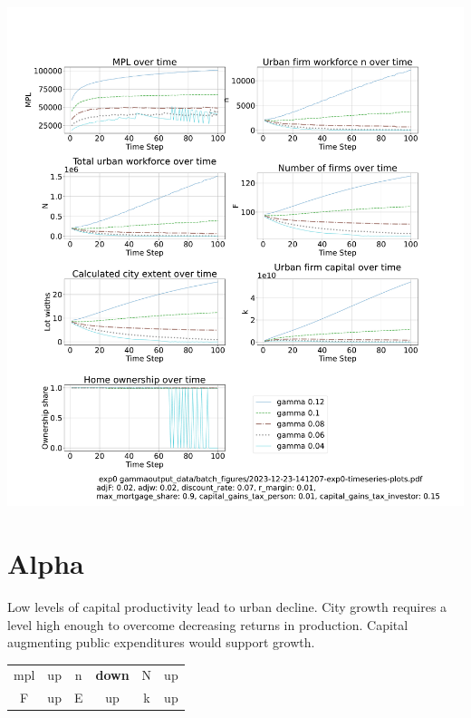 \documentclass{article}
\begin{document}
 \hspace*{-2.5cm}\includegraphics[trim= 1.5cm 3.65cm 2cm 4.0cm, clip, scale=.3]{fig/Analysis/Gamma-low-5-30.pdf}

\newpage %



\newpage %

\section{Alpha}
Low levels of capital productivity lead to urban decline. City growth requires a level high enough to overcome decreasing returns in production. Capital augmenting public expenditures would support growth.
 
\begin{tabular}{|c|c||c|c||c|c|}
mpl  & up   & n   & \textbf{down} & N   &  up \\
F    & up   & E   &  up  &  k & up
\end{tabular} 
\end{document}
